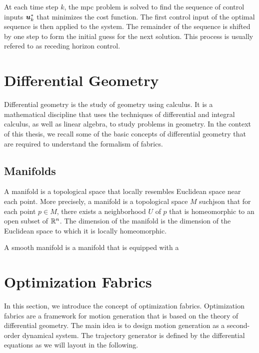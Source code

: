 At each time step $k$, the \ac{mpc} problem is solved to
find the sequence of control inputs $\bm{u}_k^*$ that minimizes
the cost function. The first control input of the optimal
sequence is then applied to the system. The remainder of the
sequence is shifted by one step to form the initial guess
for the next solution. This process is usually refered to as
receding horizon control.

\section{Differential Geometry} %
\label{sec:differential_geometry}

Differential geometry is the study of geometry using calculus.
It is a mathematical discipline that uses the techniques of
differential and integral calculus, as well as linear
algebra, to study problems in geometry. In the context of
this thesis, we recall some of the basic concepts of
differential geometry that are required to understand the
formalism of \ac{fabrics}.

\subsection{Manifolds} %
\label{sub:manifolds}

A manifold is a topological space that locally resembles
Euclidean space near each point. More precisely, a manifold
is a topological space $M$ suchjson that for each point $p\in
M$, there exists a neighborhood $U$ of $p$ that is
homeomorphic to an open subset of $\mathbb{R}^n$. The dimension of
the manifold is the dimension of the Euclidean space to
which it is locally homeomorphic.

A smooth manifold is a manifold that is equipped with a





\section{Optimization Fabrics} %
\label{sec:optimization_fabrics}

In this section, we introduce the concept of optimization
fabrics. Optimization fabrics are a framework for motion
generation that is based on the theory of differential
geometry. The main idea is to design motion generation as a
second-order dynamical system. The trajectory generator is
defined by the differential equations as we will layout in
the following.

